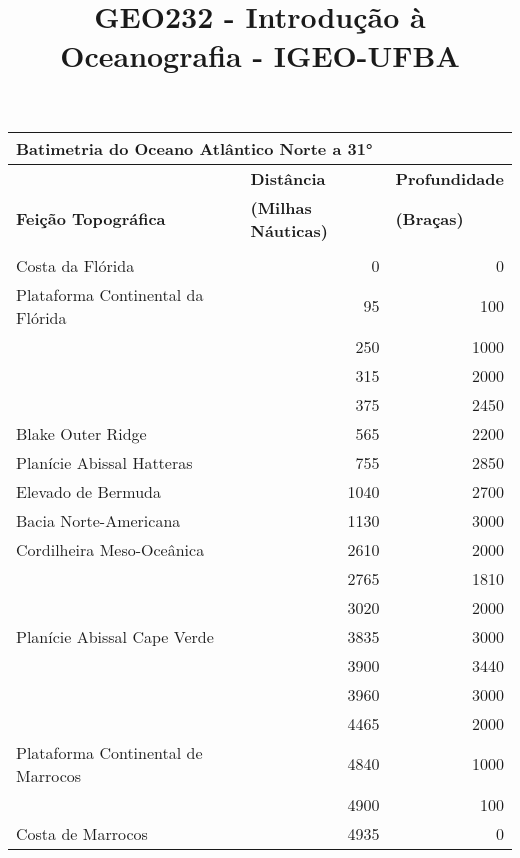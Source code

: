 \documentclass[a4paper,10pt]{article}
\title{GEO232 - Introdução à Oceanografia - IGEO-UFBA}
\author{\vspace{-10ex}}
\date{\vspace{-10ex}}
\begin{document}
\begin{landscape}

  \maketitle

  \vspace{0.5 cm}

    \begin{center}
    \begin{tabular}{l r r}
      \multicolumn{3}{l}{\Large{Batimetria do Oceano Atlântico Norte a 31\si{\degree}}} \\
      \hline
                                        & \multicolumn{1}{l}{{\bf Distância}}         & \multicolumn{1}{l}{{\bf Profundidade}}     \\
              {\bf Feição Topográfica} & \multicolumn{1}{l}{{\bf (Milhas Náuticas)}} & \multicolumn{1}{l}{{\bf (Braças)}} \\
      \hline
      \multicolumn{3}{l}{\phantom{}} \\
    Costa da Flórida                    &    0  &    0  \\
    Plataforma Continental da Flórida   &   95  &  100  \\
                                        &  250  & 1000  \\
                                        &  315  & 2000  \\
                                        &  375  & 2450  \\
    Blake Outer Ridge                   &  565  & 2200  \\
    Planície Abissal Hatteras           &  755  & 2850  \\
    Elevado de Bermuda                  & 1040  & 2700  \\
    Bacia Norte-Americana               & 1130  & 3000  \\
    Cordilheira Meso-Oceânica           & 2610  & 2000  \\
                                        & 2765  & 1810  \\
                                        & 3020  & 2000  \\
    Planície Abissal Cape Verde         & 3835  & 3000  \\
                                        & 3900  & 3440  \\
                                        & 3960  & 3000  \\
                                        & 4465  & 2000  \\
    Plataforma Continental de Marrocos  & 4840  & 1000  \\
                                        & 4900  &  100  \\
    Costa de Marrocos                   & 4935  &    0  \\
      \hline
    \end{tabular}
    \end{center}


\end{landscape}
\end{document}
